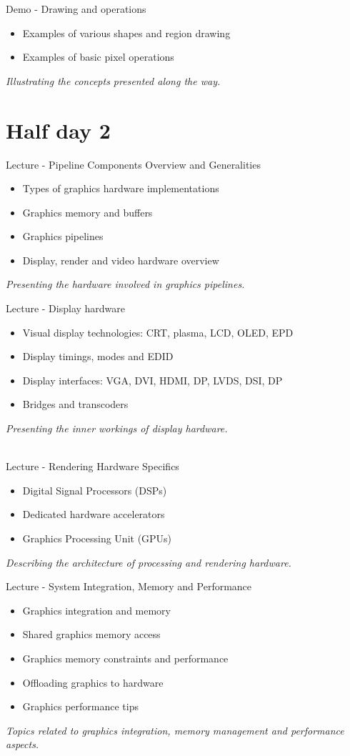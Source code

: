 \documentclass[a4paper,12pt,obeyspaces,spaces,hyphens]{article}
\begin{document}
{Demo - Drawing and operations}
{
  \begin{itemize}
  \item Examples of various shapes and region drawing
  \item Examples of basic pixel operations
  \end{itemize}
  \vspace{0.5em}
  {\em Illustrating the concepts presented along the way.}
}

\section{Half day 2}

\feagendatwocolumn
{Lecture - Pipeline Components Overview and Generalities}
{
  \begin{itemize}
  \item Types of graphics hardware implementations
  \item Graphics memory and buffers
  \item Graphics pipelines
  \item Display, render and video hardware overview
  \end{itemize}
  \vspace{0.5em}
  {\em Presenting the hardware involved in graphics pipelines.}
}
{Lecture - Display hardware}
{
  \begin{itemize}
  \item Visual display technologies: CRT, plasma, LCD, OLED, EPD
  \item Display timings, modes and EDID
  \item Display interfaces: VGA, DVI, HDMI, DP, LVDS, DSI, DP
  \item Bridges and transcoders
  \end{itemize}
  \vspace{0.5em}
  {\em Presenting the inner workings of display hardware.}
}
\\

\feagendatwocolumn
{Lecture - Rendering Hardware Specifics}
{
  \begin{itemize}
  \item Digital Signal Processors (DSPs)
  \item Dedicated hardware accelerators
  \item Graphics Processing Unit (GPUs)
  \end{itemize}
  \vspace{0.5em}
  {\em Describing the architecture of processing and rendering hardware.}
}
{Lecture - System Integration, Memory and Performance}
{
  \begin{itemize}
  \item Graphics integration and memory
  \item Shared graphics memory access
  \item Graphics memory constraints and performance
  \item Offloading graphics to hardware
  \item Graphics performance tips
  \end{itemize}
  \vspace{0.5em}
  {\em Topics related to graphics integration, memory management and performance aspects.}
}
\end{document}
